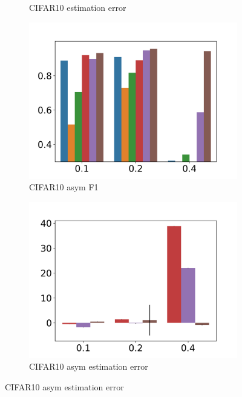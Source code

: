 \documentclass{article}
\begin{document}
\begin{figure}[h]
\begin{subfigure}[b]{0.22\textwidth}
        \vspace{-.5cm}
        \caption{CIFAR10 estimation error}
    \end{subfigure}
    \begin{subfigure}[b]{0.22\textwidth}
        \includegraphics[width=\textwidth]{figs/c10af1bar.png}
        \vspace{-.5cm}
        \caption{CIFAR10 asym F1}
    \end{subfigure}
    \begin{subfigure}[b]{0.22\textwidth}
        \includegraphics[width=\textwidth]{figs/Cifar10NE_asym_bar_mae.png}
        \vspace{-.5cm}
        \caption{CIFAR10 asym estimation error}
    \end{subfigure}
    

\end{figure}
\end{document}
